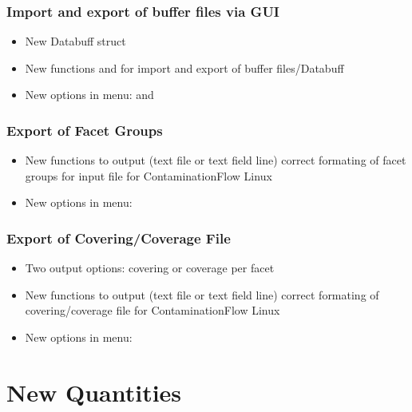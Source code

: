 \subsubsection{Import and export of buffer files via GUI}
\begin{itemize}[noitemsep,topsep=0pt]
\item New Databuff struct 
\item New functions  and  for import and export of buffer files/Databuff
\item New options in  menu:  and 
\end{itemize}

\subsubsection{Export of Facet Groups}
\begin{itemize}[noitemsep,topsep=0pt]
\item New functions to output (text file or text field line) correct formating of facet groups for input file for ContaminationFlow Linux
\item New options in  menu: 
\end{itemize}

\subsubsection{Export of Covering/Coverage File}
\begin{itemize}[noitemsep,topsep=0pt]
\item Two output options: covering or coverage per facet
\item New functions to output (text file or text field line) correct formating of covering/coverage file for ContaminationFlow Linux
\item New options in  menu: 
\end{itemize}


\section{New Quantities}
